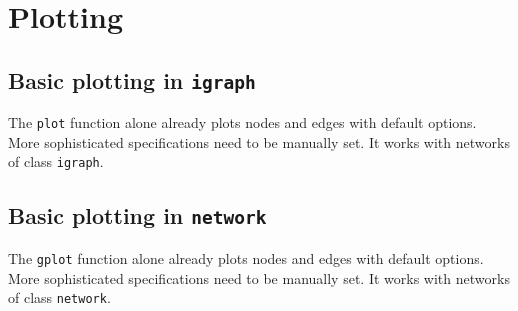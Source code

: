 \documentclass[
]{article}
\newenvironment{Shaded}{\begin{snugshade}}{\end{snugshade}}
\newcommand{\AttributeTok}[1]{\textcolor[rgb]{0.77,0.63,0.00}{#1}}
\newcommand{\CommentTok}[1]{\textcolor[rgb]{0.56,0.35,0.01}{\textit{#1}}}
\newcommand{\DecValTok}[1]{\textcolor[rgb]{0.00,0.00,0.81}{#1}}
\newcommand{\FloatTok}[1]{\textcolor[rgb]{0.00,0.00,0.81}{#1}}
\newcommand{\FunctionTok}[1]{\textcolor[rgb]{0.00,0.00,0.00}{#1}}
\newcommand{\NormalTok}[1]{#1}
\newcommand{\SpecialCharTok}[1]{\textcolor[rgb]{0.00,0.00,0.00}{#1}}
\newcommand{\StringTok}[1]{\textcolor[rgb]{0.31,0.60,0.02}{#1}}
\begin{document}
\hypertarget{plotting}{%
\section{Plotting}\label{plotting}}

\hypertarget{basic-plotting-in-igraph}{%
\subsection{\texorpdfstring{Basic plotting in
\texttt{igraph}}{Basic plotting in igraph}}\label{basic-plotting-in-igraph}}

The \texttt{plot} function alone already plots nodes and edges with
default options. More sophisticated specifications need to be manually
set. It works with networks of class \texttt{igraph}.

\begin{Shaded}
\end{Shaded}

\hypertarget{basic-plotting-in-network}{%
\subsection{\texorpdfstring{Basic plotting in
\texttt{network}}{Basic plotting in network}}\label{basic-plotting-in-network}}

The \texttt{gplot} function alone already plots nodes and edges with
default options. More sophisticated specifications need to be manually
set. It works with networks of class \texttt{network}.
\end{document}
